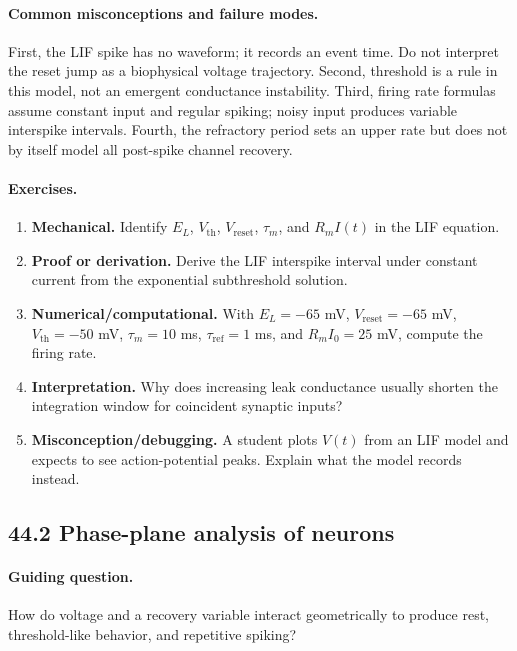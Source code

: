 \paragraph{Common misconceptions and failure modes.}
First, the LIF spike has no waveform; it records an event time. Do not interpret the reset jump as a biophysical voltage trajectory. Second, threshold is a rule in this model, not an emergent conductance instability. Third, firing rate formulas assume constant input and regular spiking; noisy input produces variable interspike intervals. Fourth, the refractory period sets an upper rate but does not by itself model all post-spike channel recovery.

\paragraph{Exercises.}
\begin{enumerate}[label=\textbf{44.1.\arabic*.}, leftmargin=*]
\item \textbf{Mechanical.} Identify \(E_L\), \(V_{\mathrm{th}}\), \(V_{\mathrm{reset}}\), \(\tau_m\), and \(R_m I(t)\) in the LIF equation.
\item \textbf{Proof or derivation.} Derive the LIF interspike interval under constant current from the exponential subthreshold solution.
\item \textbf{Numerical/computational.} With \(E_L=-65\) mV, \(V_{\mathrm{reset}}=-65\) mV, \(V_{\mathrm{th}}=-50\) mV, \(\tau_m=10\) ms, \(\tau_{\mathrm{ref}}=1\) ms, and \(R_m I_0=25\) mV, compute the firing rate.
\item \textbf{Interpretation.} Why does increasing leak conductance usually shorten the integration window for coincident synaptic inputs?
\item \textbf{Misconception/debugging.} A student plots \(V(t)\) from an LIF model and expects to see action-potential peaks. Explain what the model records instead.
\end{enumerate}

\subsection{44.2 Phase-plane analysis of neurons}

\paragraph{Guiding question.}
How do voltage and a recovery variable interact geometrically to produce rest, threshold-like behavior, and repetitive spiking?

